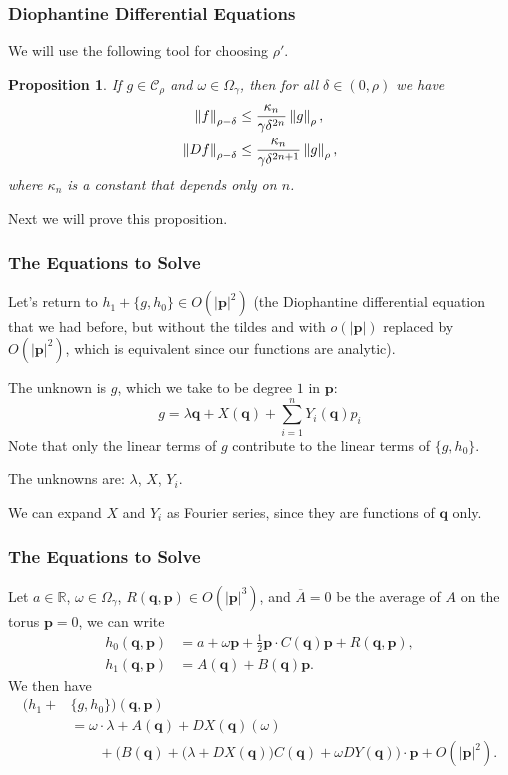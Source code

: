 \documentclass{beamer}
\newcommand{\R}{\mathbb{R}}
\newcommand{\bp}[1]{\bm{#1}}
\newcommand{\genericdel}[4]{%
  \ifcase#3\relax
  #1#4#2\or
  \bigl#1#4\bigr#2\or
  \Bigl#1#4\Bigr#2\or
  \biggl#1#4\biggr#2\or
  \Biggl#1#4\Biggr#2\else
  \left#1#4\right#2\fi
}
\newcommand{\enVert}[2][-1]{\genericdel\|\|{#1}{#2}}
\let\norm\enVert
\begin{document}
\begin{frame}
  \frametitle{Diophantine Differential Equations}
  We will use the following tool for choosing $\rho'$.
  \newtheorem{pickrho}{Proposition}
  \begin{pickrho}
    If $g \in \mathcal{C}_{\rho}$ and $\omega \in \Omega_{\gamma}$, then for all
    $\delta \in (0, \rho)$ we have
    \begin{align*}
      \norm{f}_{\rho - \delta} &\leq \frac{\kappa_n}{\gamma \delta^{2n}}
               \norm{g}_{\rho},\\
      \norm{Df}_{\rho - \delta} &\leq \frac{\kappa_n}{\gamma \delta^{2n+1}}
                \norm{g}_{\rho},\\
    \end{align*}
    where $\kappa_n$ is a constant that depends only on $n$.
  \end{pickrho}
  Next we will prove this proposition.
\end{frame}

\begin{frame}
  \frametitle{The Equations to Solve}
  Let's return to $h_1 + \{g, h_0\} \in O(|\bp{p}|^2)$ (the Diophantine differential
  equation that we had before, but without the tildes and with $o(|\bp{p}|)$
  replaced by $O(|\bp{p}|^2)$, which is equivalent since our functions are
  analytic).

  The unknown is $g$, which we take to be degree $1$ in $\bp{p}$:
  \begin{equation*}
    g = \lambda \bp{q} + X(\bp{q}) + \sum_{i = 1}^n Y_i(\bp{q}) p_i
  \end{equation*}
  Note that only the linear terms of $g$ contribute to the linear terms of $\{g,
  h_0\}$.

  The unknowns are: $\lambda$, $X$, $Y_i$.

  We can expand $X$ and $Y_i$ as Fourier series, since they are functions of
  $\bp{q}$ only.
\end{frame}

\begin{frame}
  \frametitle{The Equations to Solve}
  Let $a \in \R$, $\omega \in \Omega_{\gamma}$,
  $R(\bp{q}, \bp{p}) \in O(|\bp{p}|^3)$, and $\overline{A} = 0$ be the average
  of $A$ on the torus $\bp{p} = 0$, we can write
  \begin{align*}
    h_0(\bp{q}, \bp{p}) &= a + \omega \bp{p} + \frac{1}{2} \bp{p} \cdot
                          C(\bp{q}) \bp{p} + R(\bp{q}, \bp{p}),\\
    h_1(\bp{q}, \bp{p}) &= A(\bp{q}) + B(\bp{q}) \bp{p}.
  \end{align*}
  We then have
  \begin{align*}
    (h_1 + &\{g, h_0\}) (\bp{q}, \bp{p})\\
           &= \omega \cdot \lambda + A(\bp{q}) + DX(\bp{q})(\omega)\\
           &\qquad + \Big(B(\bp{q}) + \big( \lambda + DX(\bp{q}) \big) C(\bp{q}) +
             \omega DY(\bp{q}) \Big) \cdot \bp{p} + O(|\bp{p}|^2).
  \end{align*}
\end{frame}
\end{document}
